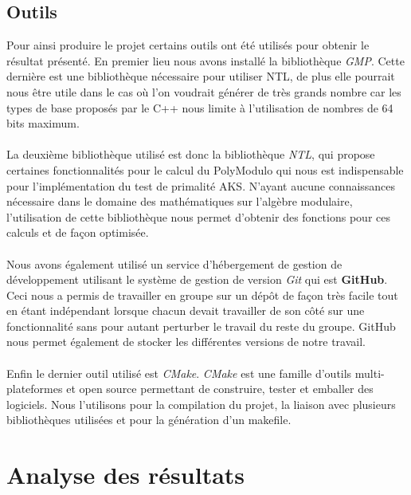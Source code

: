 		\subsection{Outils}
		Pour ainsi produire le projet certains outils ont été utilisés pour obtenir le résultat présenté. En premier lieu nous avons installé la bibliothèque \textit{GMP}\cite{gmp}. Cette dernière est une bibliothèque nécessaire pour utiliser NTL, de plus elle pourrait nous être utile dans le cas où l'on voudrait générer de très grands nombre car les types de base proposés par le C++ nous limite à l'utilisation de nombres de 64 bits maximum.
		\paragraph{}La deuxième bibliothèque utilisé est donc la bibliothèque \textit{NTL}\cite{ntl}, qui propose certaines fonctionnalités pour le calcul du PolyModulo\cite{AKS} qui nous est indispensable pour l'implémentation du test de primalité AKS. N'ayant aucune connaissances nécessaire dans le domaine des mathématiques sur l'algèbre modulaire, l'utilisation de cette bibliothèque nous permet d'obtenir des fonctions pour ces calculs et de façon optimisée.  
		\paragraph{}Nous avons également utilisé un service d’hébergement de gestion de développement utilisant le système de gestion de version \textit{Git} qui est \textbf{GitHub}. Ceci nous a permis de travailler en groupe sur un dépôt de façon très facile tout en étant indépendant lorsque chacun devait travailler de son côté sur une fonctionnalité sans pour autant perturber le travail du reste du groupe. GitHub nous permet également de stocker les différentes versions de notre travail.   
		\paragraph{}Enfin le dernier outil utilisé est \textit{CMake}\cite{cmake}. \textit{CMake} est une famille d'outils multi-plateformes et open source permettant de construire, tester et emballer des logiciels. Nous l'utilisons pour la compilation du projet, la liaison avec plusieurs bibliothèques utilisées et pour la génération d'un makefile. 
			
	\section{Analyse des résultats}
